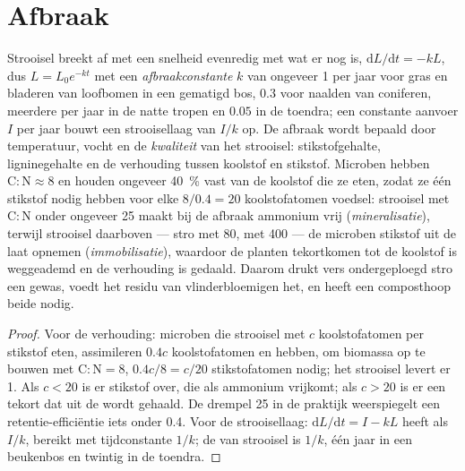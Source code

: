 \section{Afbraak}

\begin{theorem}\label{thm:b2:living-soil:decay}
Strooisel breekt af met een snelheid evenredig met wat er nog is,
$\mathrm{d}L/\mathrm{d}t = -kL$, dus $L = L_0 e^{-kt}$ met een
\emph{afbraakconstante} $k$ van ongeveer 1 per jaar voor gras en
bladeren van loofbomen in een gematigd bos, $0.3$ voor naalden van coniferen,
meerdere per jaar in de natte tropen en $0.05$ in de toendra;
een constante aanvoer $I$ per jaar bouwt een strooisellaag van $I/k$ op. De
afbraak wordt bepaald door temperatuur, vocht en de \emph{kwaliteit} van het
strooisel: stikstofgehalte, ligninegehalte en de verhouding tussen koolstof en
stikstof. Microben hebben $\mathrm{C:N} \approx 8$ en
houden ongeveer \qty{40}{\%} vast van de koolstof die ze eten, zodat ze één
stikstof nodig hebben voor elke $8/0.4 = 20$ koolstofatomen voedsel: strooisel
met $\mathrm{C:N}$ onder ongeveer 25 maakt bij de afbraak ammonium vrij
(\emph{mineralisatie}), terwijl strooisel daarboven --- stro met 80,
 met 400 --- de microben stikstof uit de  laat opnemen
(\emph{immobilisatie}), waardoor de planten tekortkomen tot de koolstof is
weggeademd en de verhouding is gedaald. Daarom drukt vers ondergeploegd stro
een gewas, voedt het residu van vlinderbloemigen het, en heeft een composthoop
beide nodig.
\end{theorem}
\begin{proof}
Voor de verhouding: microben die strooisel met $c$ koolstofatomen per
stikstof eten, assimileren $0.4c$ koolstofatomen en hebben, om biomassa op te
bouwen met $\mathrm{C:N} = 8$, $0.4c/8 = c/20$ stikstofatomen nodig; het
strooisel levert er 1. Als $c < 20$ is er stikstof over, die als ammonium
vrijkomt; als $c > 20$ is er een tekort dat uit de  wordt gehaald. De
drempel 25 in de praktijk weerspiegelt een retentie-efficiëntie iets
onder 0.4. Voor de strooisellaag: $\mathrm{d}L/\mathrm{d}t = I - kL$
heeft als  $I/k$, bereikt met tijdconstante $1/k$; de
 van strooisel is $1/k$, één jaar in een beukenbos en
twintig in de toendra.
\end{proof}

